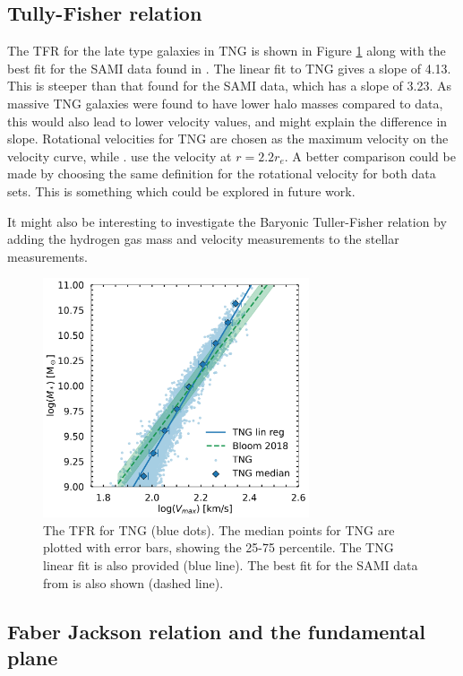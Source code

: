 \subsection{Tully-Fisher relation}
The TFR for the late type galaxies in TNG is shown in Figure \ref{tfr_res} along with the best fit for the SAMI data found in \textcite{Bloom2017}. The linear fit to TNG gives a slope of 4.13. This is steeper than that found for the SAMI data, which has a slope of 3.23. As massive TNG galaxies were found to have lower halo masses compared to data, this would also lead to lower velocity values, and might explain the difference in slope. Rotational velocities for TNG are chosen as the maximum velocity on the velocity curve, while \textcite{Bloom2017}. use the velocity at $r = 2.2 r_e$. A better comparison could be made by choosing the same definition for the rotational velocity for both data sets. This is something which could be explored in future work.

It might also be interesting to investigate the Baryonic Tuller-Fisher relation by adding the hydrogen gas mass and velocity measurements to the stellar measurements. 

\begin{figure}
    \centering
    \includegraphics[width=0.7\textwidth]{images/results_tully_fisher.png}
    \caption{The TFR for TNG (blue dots). The median points for TNG are plotted with error bars, showing the 25-75 percentile. The TNG linear fit is also provided (blue line). The best fit for the SAMI data from \textcite{Bloom2017} is also shown (dashed line).}
    \label{tfr_res}
\end{figure}

\subsection{Faber Jackson relation and the fundamental plane}


